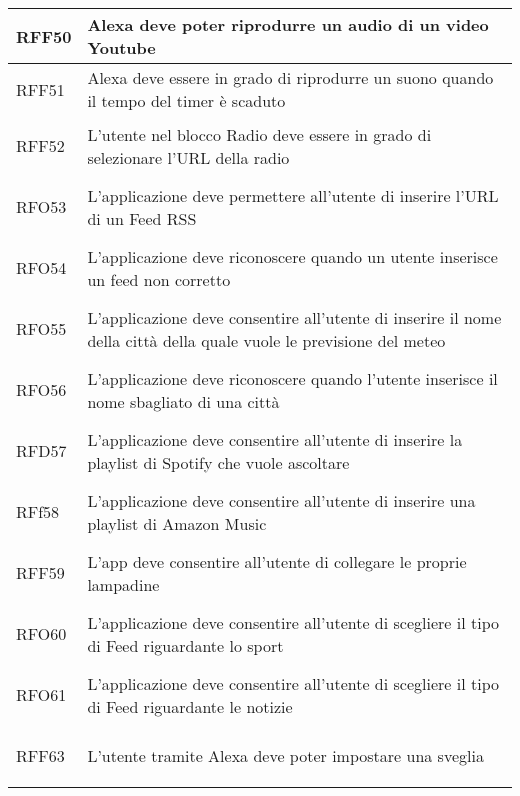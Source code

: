 \begin{longtable}{|>{\centering}m{5em}|m{25em}|}
	\hypertarget{RFF50}{RFF50} & Alexa deve poter riprodurre un audio di un video Youtube\\ \hline
	
	\hypertarget{RFF51}{RFF51} & Alexa deve essere in grado di riprodurre un suono quando il tempo del timer è scaduto\\ \hline
	
	\hypertarget{RFF52}{RFF52} & L'utente nel blocco Radio deve essere in grado di selezionare l'URL della radio\\ \hline
	
	\hypertarget{RFO53}{RFO53} & L'applicazione deve permettere all'utente di inserire l'URL di un Feed RSS\\ \hline
	
	\hypertarget{RFO54}{RFO54} & L'applicazione deve riconoscere quando un utente inserisce un feed non corretto\\ \hline
	
	\hypertarget{RFO55}{RFO55} & L'applicazione deve consentire all'utente di inserire il nome della città della quale vuole le previsione del meteo\\ \hline
	
	\hypertarget{RFO56}{RFO56} & L'applicazione deve riconoscere quando l'utente inserisce il nome sbagliato di una città\\ \hline
	
	\hypertarget{RFD57}{RFD57} & L'applicazione deve consentire all'utente di inserire la playlist di Spotify che vuole ascoltare\\ \hline
	
	\hypertarget{RFF58}{RFf58} & L'applicazione deve consentire all'utente di inserire una playlist di Amazon Music\\ \hline
	
	\hypertarget{RFF59}{RFF59} & L'app deve consentire all'utente di collegare le proprie lampadine\\ \hline
	
	\hypertarget{RFO60}{RFO60} & L'applicazione deve consentire all'utente di scegliere il tipo di Feed riguardante lo sport\\ \hline
	
	\hypertarget{RFO61}{RFO61} & L'applicazione deve consentire all'utente di scegliere il tipo di Feed riguardante le notizie\\ \hline
	
	\hypertarget{RFF63}{RFF63} & L'utente tramite Alexa deve poter impostare una sveglia\\ \hline
	

\end{longtable}
